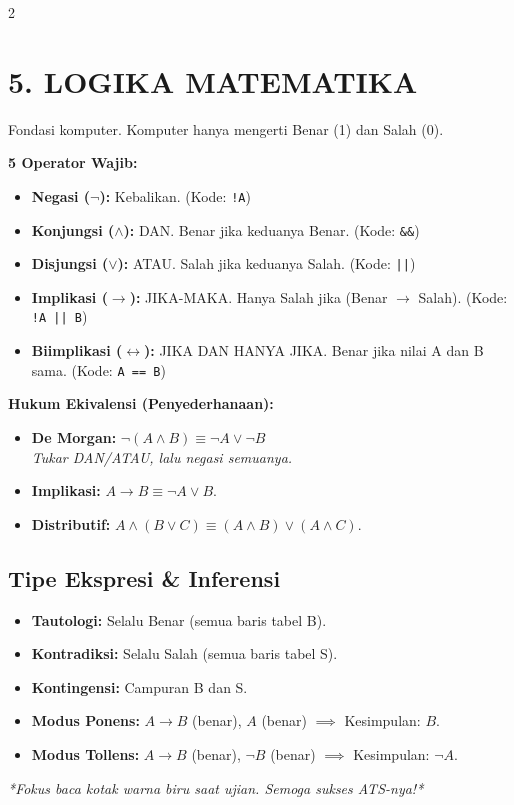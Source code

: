 \documentclass[9pt,a4paper]{extarticle}
\begin{document}
\begin{multicols}{2}
\section*{5. LOGIKA MATEMATIKA}
Fondasi komputer. Komputer hanya mengerti Benar (1) dan Salah (0).

\textbf{5 Operator Wajib:}
\begin{itemize}
    \item \textbf{Negasi (\(\neg\)):} Kebalikan. (Kode: \texttt{!A})
    \item \textbf{Konjungsi (\(\wedge\)):} DAN. Benar jika keduanya Benar. (Kode: \texttt{\&\&})
    \item \textbf{Disjungsi (\(\vee\)):} ATAU. Salah jika keduanya Salah. (Kode: \texttt{||})
    \item \textbf{Implikasi (\(\to\)):} JIKA-MAKA. Hanya Salah jika (Benar \(\to\) Salah). (Kode: \texttt{!A || B})
    \item \textbf{Biimplikasi (\(\leftrightarrow\)):} JIKA DAN HANYA JIKA. Benar jika nilai A dan B sama. (Kode: \texttt{A == B})
\end{itemize}

\begin{rumusbox}
\textbf{\textcolor{blue!70!black}{Hukum Ekivalensi (Penyederhanaan):}}
\begin{itemize}
    \item \textbf{De Morgan:} \(\neg(A \wedge B) \equiv \neg A \vee \neg B\) \\
    \textit{Tukar DAN/ATAU, lalu negasi semuanya.}
    \item \textbf{Implikasi:} \(A \to B \equiv \neg A \vee B\).
    \item \textbf{Distributif:} \(A \wedge (B \vee C) \equiv (A \wedge B) \vee (A \wedge C)\).
\end{itemize}
\end{rumusbox}

\subsection*{Tipe Ekspresi \& Inferensi}
\begin{itemize}
    \item \textbf{Tautologi:} Selalu Benar (semua baris tabel B).
    \item \textbf{Kontradiksi:} Selalu Salah (semua baris tabel S).
    \item \textbf{Kontingensi:} Campuran B dan S.
    \item \textbf{Modus Ponens:} \(A \to B\) (benar), \(A\) (benar) \(\implies\) Kesimpulan: \(B\).
    \item \textbf{Modus Tollens:} \(A \to B\) (benar), \(\neg B\) (benar) \(\implies\) Kesimpulan: \(\neg A\).
\end{itemize}

\vspace{3mm}
\begin{center}
    \textit{*Fokus baca kotak warna biru saat ujian. Semoga sukses ATS-nya!*}
\end{center}

\end{multicols}
\end{document}
